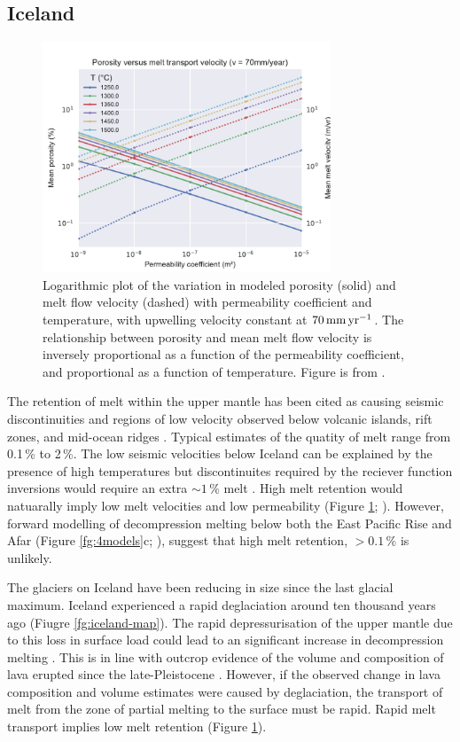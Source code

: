\subsection{Iceland}

\begin{figure}[htbp]
\includegraphics[width=8.6cm]{figures/ch2-phi-vm.pdf}
\caption{Logarithmic plot of the variation in modeled porosity (solid) and melt flow velocity (dashed) with permeability coefficient and temperature, with upwelling velocity constant at $70\rm\,mm\,yr^{-1}$. The relationship between porosity and mean melt flow velocity is inversely proportional as a function of the permeability coefficient, and proportional as a function of temperature. Figure is from \cite{franken-etal-2020}.}
\label{fg:phi-vm}
\end{figure}

The retention of melt within the upper mantle has been cited as causing seismic discontinuities and regions of low velocity observed below volcanic islands, rift zones, and mid-ocean ridges \citep[e.g.][]{forsyth-etal-1998,harmon-etal-2009,rychert-etal-2012,rychert-etal-2015}. Typical estimates of the quatity of melt range from 0.1\,\% to 2\,\%. The low seismic velocities below Iceland can be explained by the presence of high temperatures but discontinuites required by the reciever function inversions would require an extra $\sim 1$\,\% melt \citep{rychert-etal-2018}. High melt retention would natuarally imply low melt velocities and low permeability (Figure \ref{fg:phi-vm}; \citealp{franken-etal-2020}). However, forward modelling of decompression melting below both the East Pacific Rise and Afar (Figure \ref{fg:4models}c; \citealp{goes-etal-2012,armitage-etal-2015}), suggest that high melt retention, $>0.1$\,\% is unlikely. 

The glaciers on Iceland have been reducing in size since the last glacial maximum. Iceland experienced a rapid deglaciation around ten thousand years ago (Fiugre \ref{fg:iceland-map}). The rapid depressurisation of the upper mantle due to this loss in surface load could lead to an significant increase in decompression melting \citep{jull-996}. This is in line with outcrop evidence of the volume and composition of lava erupted since the late-Pleistocene \citep{maclennan-etal-2002,sinton-etal-2005,eksinchol-etal-2019}. However, if the observed change in lava composition and volume estimates were caused by deglaciation, the transport of melt from the zone of partial melting to the surface must be rapid. Rapid melt transport implies low melt retention (Figure \ref{fg:phi-vm}).

